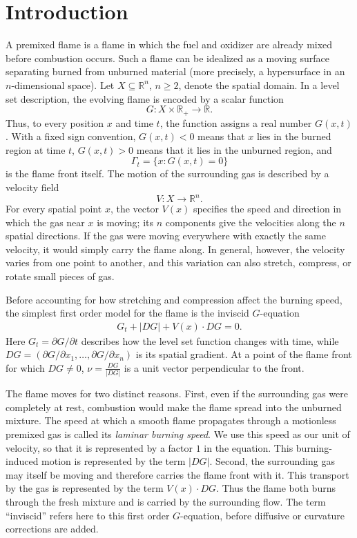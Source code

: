 \documentclass[11pt,reqno,noamsfonts]{amsart}
\theoremstyle{definition}
\theoremstyle{remark}
\begin{document}
\section{Introduction}\label{sec:introduction}
A premixed flame is a flame in which the fuel and oxidizer are already
mixed before combustion occurs. Such a flame can be idealized as a moving surface separating burned
from unburned material (more precisely, a hypersurface in an 
$n$-dimensional space). Let
$X\subseteq\mathbb R^n$, $n\geq2$, denote the spatial domain. In a
level set description, the evolving flame is encoded by a scalar
function
\[
  G:X\times\mathbb R_+\to\mathbb R.
\]
Thus, to every position $x$ and time $t$, the function assigns a real
number $G(x,t)$. With a fixed sign convention, $G(x,t)<0$ means that
$x$ lies in the burned region at time $t$, $G(x,t)>0$ means that it lies
in the unburned region, and
\[
  \Gamma_t=\{x:G(x,t)=0\}
\]
is the flame front itself.
The motion of the surrounding gas is described by a velocity field
\[
  V:X\to\mathbb R^n.
\]
For every spatial point $x$, the vector $V(x)$ specifies the speed and
direction in which the gas near $x$ is moving; its $n$ components give
the velocities along the $n$ spatial directions. If the gas were moving
everywhere with exactly the same velocity, it would simply carry the
flame along. In general, however, the velocity varies from one point to
another, and this variation can also stretch, compress, or rotate small
pieces of gas.

Before accounting for how stretching and compression affect the burning
speed, the simplest first order model for the flame is the inviscid
$G$-equation
\begin{align}\label{inviscid-eq}
    G_t+|DG|+V(x)\cdot DG=0.
\end{align}
Here $G_t=\partial G/\partial t$ describes how the level set function changes with time, while
$DG = (\partial G/\partial x_1, \ldots, \partial G/\partial x_n )$ is its spatial gradient. At a point of the flame front for which
$DG\neq0$,
  $\nu=\frac{DG}{|DG|}$
is a unit vector perpendicular to the front.

The flame moves for two distinct reasons. First, even if the surrounding
gas were completely at rest, combustion would make the flame spread into
the unburned mixture. The speed at which a smooth flame propagates through
a motionless premixed gas is called its {\em laminar burning speed}. We use
this speed as our unit of velocity, so that it is represented by a factor $1$ in the equation. This burning-induced motion is represented
by the term $|DG|$. Second, the surrounding gas may itself be moving and
therefore carries the flame front with it. This transport by the gas is
represented by the term $V(x)\cdot DG$. Thus the flame both burns through
the fresh mixture and is carried by the surrounding flow. The term
``inviscid'' refers here to this first order $G$-equation, before
diffusive or curvature corrections are added.
\end{document}
